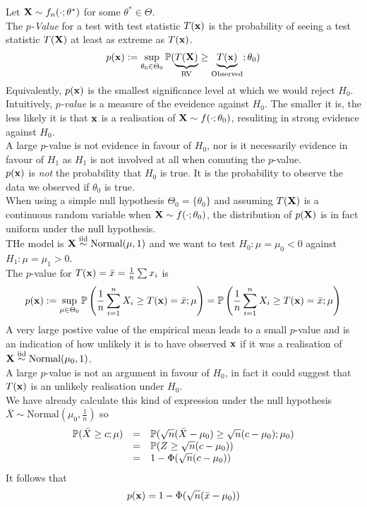 \documentclass[11pt,a4paper]{article}
\begin{document}
Let $\textbf{X}\sim f_n(\cdot;\theta^*)$ for some $\theta^*\in\Theta$.\\
The \textit{$p$-Value} for a test with test statistic $T(\textbf{x})$ is the probability of seeing a test statistic $T(\textbf{X})$ at least as extreme as $T(\textbf{x})$.
$$p(\textbf{x}):=\sup_{\theta_0\in\Theta_0}\mathbb{P}(\underbrace{T(\textbf{X})}_{\text{RV}}\geq \underbrace{T(\textbf{x})}_{\text{Observed}};\theta_0)$$
Equivalently, $p(\textbf{x})$ is the smallest significance level at which we would reject $H_0$.\\

Intuitively, \textit{$p$-value} is a measure of the eveidence against $H_0$. The smaller it is, the less likely it is that $\textbf{x}$ is a realisation of $\textbf{X}\sim f(\cdot;\theta_0)$, resuliting in strong evidence against $H_0$.\\
\nb A large $p$-value is not evidence in favour of $H_0$, nor is it necessarily evidence in favour of $H_1$ as $H_1$ is not involved at all when comuting the $p$-value.\\

$p(\textbf{x})$ is \textit{not} the probability that $H_0$ is true. It is the probability to observe the data we observed if $\theta_0$ is true.\\

When using a simple null hypothesis $\Theta_0=\{\theta_0\}$ and assuming $T(\textbf{X})$ is a continuous random variable when $\textbf{X}\sim f(\cdot;\theta_0)$, the distribution of $p(\textbf{X})$ is in fact uniform under the null hypothesis.\\

THe model is $\textbf{X}\overset{\text{iid}}{\sim}\text{Normal}(\mu,1)$ and we want to test $H_0:\mu=\mu_0<0$ against $H_1:\mu=\mu_1>0$.\\
The $p$-value for $T(\textbf{x})=\bar{x}=\frac{1}{n}\sum x_i$ is
$$p(\textbf{x}):=\sup_{\mu\in\Theta_0}\mathbb{P}\left(\frac{1}{n}\sum_{i=1}^nX_i\geq T(\textbf{x})=\bar{x};\mu\right)=\mathbb{P}\left(\frac{1}{n}\sum_{i=1}^nX_i\geq T(\textbf{x})=\bar{x};\mu\right)$$
A very large postive value of the empirical mean leads to a small $p$-value and is an indication of how unlikely it is to have observed $\textbf{x}$ if it was a realisation of $\textbf{X}\overset{\text{iid}}{\sim}\text{Normal}(\mu_0,1)$.\\
A large $p$-value is not an argument in favour of $H_0$, in fact it could suggest that $T(\textbf{x})$ is an unlikely realisation under $H_0$.\\
We have already calculate this kind of expression under the null hypothesis $\bar{X}\sim\text{Normal}(\mu_0,\frac{1}{n})$ so
\[\begin{array}{rcl}
\mathbb{P}(\bar{X}\geq c;\mu)&=&\mathbb{P}(\sqrt{n}(\bar{X}-\mu_0)\geq\sqrt{n}(c-\mu_0);\mu_0)\\
&=&\mathbb{P}(Z\geq\sqrt{n}(c-\mu_0))\\
&=&1-\Phi(\sqrt{n}(c-\mu_0))
\end{array}\]
It follows that
$$p(\textbf{x})=1-\Phi(\sqrt{n}(\bar{x}-\mu_0))$$
\end{document}
